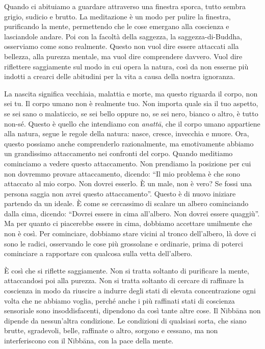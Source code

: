 Quando ci abituiamo a guardare attraverso una finestra sporca, tutto
sembra grigio, sudicio e brutto. La meditazione è un modo per pulire la
finestra, purificando la mente, permettendo che le cose emergano alla
coscienza e lasciandole andare. Poi con la facoltà della saggezza, la
saggezza-di-Buddha, osserviamo come sono realmente. Questo non vuol dire
essere attaccati alla bellezza, alla purezza mentale, ma vuol dire
comprendere davvero. Vuol dire riflettere saggiamente sul modo in cui
opera la natura, così da non esserne più indotti a crearci delle
abitudini per la vita a causa della nostra ignoranza.

La nascita significa vecchiaia, malattia e morte, ma questo riguarda il
corpo, non sei tu. Il corpo umano non è realmente tuo. Non importa quale
sia il tuo aspetto, se sei sano o malaticcio, se sei bello oppure no, se
sei nero, bianco o altro, è tutto non-sé. Questo è quello che intendiamo
con \emph{anattā}, che il corpo umano appartiene alla natura, segue le
regole della natura: nasce, cresce, invecchia e muore. Ora, questo
possiamo anche comprenderlo razionalmente, ma emotivamente abbiamo un
grandissimo attaccamento nei confronti del corpo. Quando meditiamo
cominciamo a vedere questo attaccamento. Non prendiamo la posizione per
cui non dovremmo provare attaccamento, dicendo: ``Il mio problema è che
sono attaccato al mio corpo. Non dovrei esserlo. È un male, non è vero?
Se fossi una persona saggia non avrei questo attaccamento''. Questo è di
nuovo iniziare partendo da un ideale. È come se cercassimo di scalare un
albero cominciando dalla cima, dicendo: ``Dovrei essere in cima
all'albero. Non dovrei essere quaggiù''. Ma per quanto ci piacerebbe
essere in cima, dobbiamo accettare umilmente che non è così. Per
cominciare, dobbiamo stare vicini al tronco dell'albero, là dove ci sono
le radici, osservando le cose più grossolane e ordinarie, prima di
poterci cominciare a rapportare con qualcosa sulla vetta dell'albero.

È così che si riflette saggiamente. Non si tratta soltanto di purificare
la mente, attaccandosi poi alla purezza. Non si tratta soltanto di
cercare di raffinare la coscienza in modo da riuscire a indurre degli
stati di elevata concentrazione ogni volta che ne abbiamo voglia, perché
anche i più raffinati stati di coscienza sensoriale sono
insoddisfacenti, dipendono da così tante altre cose. Il Nibbāna non
dipende da nessun'altra condizione. Le condizioni di qualsiasi sorta,
che siano brutte, sgradevoli, belle, raffinate o altro, sorgono e
cessano, ma non interferiscono con il Nibbāna, con la pace della mente.

